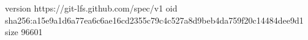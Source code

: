 version https://git-lfs.github.com/spec/v1
oid sha256:a15e9a1d6a77ea6c6ae16cd2355c79c4c527a8d9beb4da759f20c14484dee9d1
size 96601
